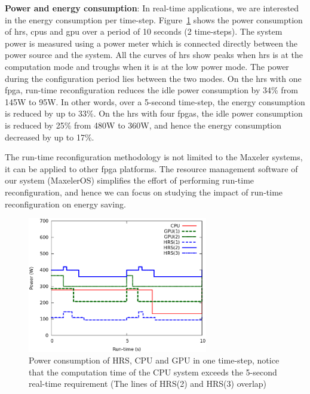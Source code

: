 \textbf{Power and energy consumption}: In real-time applications, we are interested in the energy consumption per time-step.
Figure~\ref{fig:power} shows the power consumption of \gls{hrs}, \gls{cpu}s and \gls{gpu} over a period of 10 seconds (2 time-steps).
The system power is measured using a power meter which is connected directly between the power source and the system.
All the curves of \gls{hrs} show peaks when \gls{hrs} is at the computation mode and troughs when it is at the low power mode.
The power during the configuration period lies between the two modes.
On the \gls{hrs} with one \gls{fpga}, run-time reconfiguration reduces the idle power consumption by 34\% from 145W to 95W.
In other words, over a 5-second time-step, the energy consumption is reduced by up to 33\%.
On the \gls{hrs} with four \gls{fpga}s, the idle power consumption is reduced by 25\% from 480W to 360W, and hence the energy consumption decreased by up to 17\%.

The run-time reconfiguration methodology is not limited to the Maxeler systems, it can be applied to other \gls{fpga} platforms.
The resource management software of our system (MaxelerOS) simplifies the effort of performing run-time reconfiguration, and hence we can focus on studying the impact of run-time reconfiguration on energy saving.

\begin{figure}[t!]
\centering
\includegraphics[width=0.7\textwidth]{4_adaptation/figures/fig_power2}
\caption[Power consumption of HRS, CPU and GPU in one time-step, notice that the computation time of the CPU system exceeds the 5-second real-time requirement]{Power consumption of HRS, CPU and GPU in one time-step, notice that the computation time of the CPU system exceeds the 5-second real-time requirement (The lines of HRS(2) and HRS(3) overlap)}
\label{fig:power}
\end{figure}

